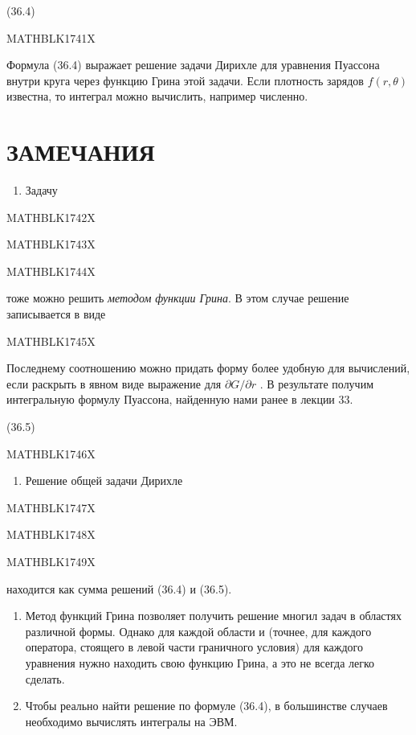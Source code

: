 \documentclass[
]{article}
\providecommand{\tightlist}{%
  \setlength{\itemsep}{0pt}\setlength{\parskip}{0pt}}
\begin{document}
{{{(36.4)

MATHBLK1741X

Формула (36.4) выражает решение задачи Дирихле для уравнения Пуассона
внутри круга через функцию Грина этой задачи. Если плотность зарядов
\(f(r, \theta)\) известна, то интеграл можно вычислить, например
численно.

\section{ЗАМЕЧАНИЯ}\label{ux437ux430ux43cux435ux447ux430ux43dux438ux44f-15}

\begin{enumerate}
\def\labelenumi{\arabic{enumi}.}
\tightlist
\item
  Задачу
\end{enumerate}

MATHBLK1742X

MATHBLK1743X

MATHBLK1744X

тоже можно решить \emph{методом функции Грина}. В этом случае решение
записывается в виде

MATHBLK1745X

Последнему соотношению можно придать форму более удобную для вычислений,
если раскрыть в явном виде выражение для \(\partial G/\partial r\) . В
результате получим интегральную формулу Пуассона, найденную нами ранее в
лекции 33.

(36.5)

MATHBLK1746X

\begin{enumerate}
\def\labelenumi{\arabic{enumi}.}
\setcounter{enumi}{1}
\tightlist
\item
  Решение общей задачи Дирихле
\end{enumerate}

MATHBLK1747X

MATHBLK1748X

MATHBLK1749X

находится как сумма решений (36.4) и (36.5).

\begin{enumerate}
\def\labelenumi{\arabic{enumi}.}
\setcounter{enumi}{2}
\item
  Метод функций Грина позволяет получить решение многил задач в областях
  различной формы. Однако для каждой области и (точнее, для каждого
  оператора, стоящего в левой части граничного условия) для каждого
  уравнения нужно находить свою функцию Грина, а это не всегда легко
  сделать.
\item
  Чтобы реально найти решение по формуле (36.4), в большинстве случаев
  необходимо вычислять интегралы на ЭВМ.
\end{enumerate}

}}}
\end{document}
